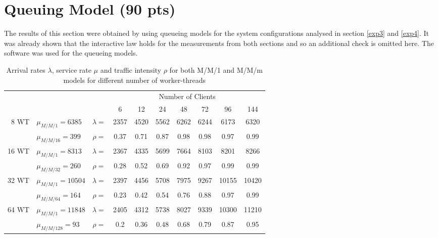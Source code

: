 \documentclass[report.tex]{subfiles}
\begin{document}
\section{Queuing Model (90 pts)}

The results of this section were obtained by using queueing models for the system configurations analysed in section \ref{exp3} and \ref{exp4}. It was already shown that the interactive law holds for the measurements from both sections and so an additional check is omitted here.
The software \cite{queueing} was used for the queueing models.


\begin{table}[H]
	\centering
	\begin{tabular}{r|lcccccccc|}
		\multicolumn{3}{c}{}  & \multicolumn{7}{c}{Number of Clients}\Tstrut \\ 
		\multicolumn{3}{c}{}   & 6 & 12 & 24 & 48 & 72 & 96 & \multicolumn{1}{c}{144} \\ 
		\cline{2-10}
		\multirow{2}{*}{8 WT } & $\mu_{M/M/1} = 6385$ & $\lambda = $ & 2357 & 4520 & 5562 & 6262 & 6244 & 6173 & 6320\Tstrut \\
		& $\mu_{M/M/16} = 399$ & $\rho =$ & 0.37 & 0.71 & 0.87 & 0.98 & 0.98 & 0.97 & 0.99 \\
		\cline{2-10}
		\multirow{2}{*}{16 WT } & $\mu_{M/M/1} = 8313$ & $\lambda = $ & 2367 & 4335 & 5699 & 7664 & 8103 & 8201 & 8266\Tstrut \\
		& $\mu_{M/M/32} = 260$ & $\rho =$ & 0.28 & 0.52 & 0.69 & 0.92 & 0.97 & 0.99 & 0.99 \\
		\cline{2-10}
		\multirow{2}{*}{32 WT } & $\mu_{M/M/1} = 10504$ & $\lambda = $ & 2397 & 4456 & 5708 & 7975 & 9267 & 10155 & 10420\Tstrut \\
		& $\mu_{M/M/64} = 164$ & $\rho =$ & 0.23 & 0.42 & 0.54 & 0.76 & 0.88 & 0.97 & 0.99 \\
		\cline{2-10}
		\multirow{2}{*}{64 WT } & $\mu_{M/M/1} = 11848$ & $\lambda = $ & 2405 & 4312 & 5738 & 8027 & 9339 & 10300 & 11210\Tstrut \\
		& $\mu_{M/M/128} = 93$ & $\rho =$ & 0.2 & 0.36 & 0.48 & 0.68 & 0.79 & 0.87 & 0.95 \\
		\cline{2-10}
	\end{tabular}
	\caption{Arrival rates $\lambda$, service rate $\mu$ and traffic intensity $\rho$ for both M/M/1 and M/M/m models for different number of worker-threads} \label{exp70_arrival_service_traffic} 
\end{table}
\end{document}
